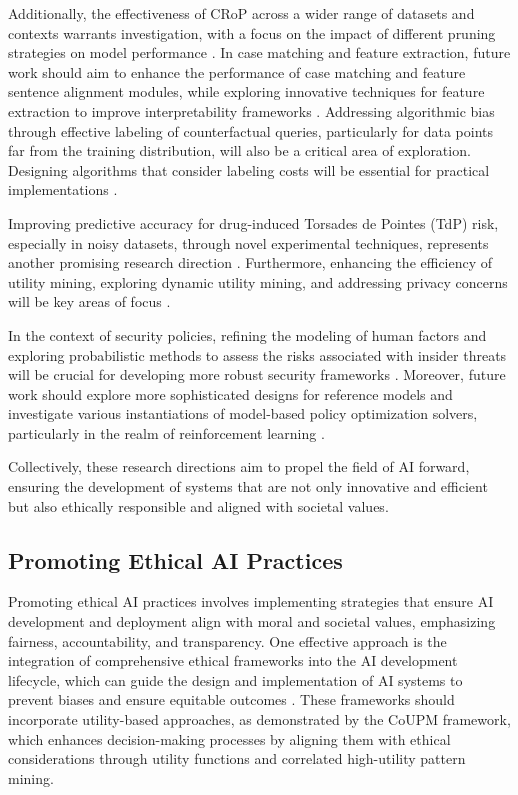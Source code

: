 Additionally, the effectiveness of CRoP across a wider range of datasets and contexts warrants investigation, with a focus on the impact of different pruning strategies on model performance \cite{kaur2024cropcontextwiserobuststatic}. In case matching and feature extraction, future work should aim to enhance the performance of case matching and feature sentence alignment modules, while exploring innovative techniques for feature extraction to improve interpretability frameworks \cite{lin2023interpretabilityframeworksimilarcase}. Addressing algorithmic bias through effective labeling of counterfactual queries, particularly for data points far from the training distribution, will also be a critical area of exploration. Designing algorithms that consider labeling costs will be essential for practical implementations \cite{sen2018supervisingfeatureinfluence}.

Improving predictive accuracy for drug-induced Torsades de Pointes (TdP) risk, especially in noisy datasets, through novel experimental techniques, represents another promising research direction \cite{xi2022statisticallearningpreclinicaldrug}. Furthermore, enhancing the efficiency of utility mining, exploring dynamic utility mining, and addressing privacy concerns will be key areas of focus \cite{gan2019correlatedutilitybasedpatternmining}.

In the context of security policies, refining the modeling of human factors and exploring probabilistic methods to assess the risks associated with insider threats will be crucial for developing more robust security frameworks \cite{kammller2020applyingisabelleinsiderframework}. Moreover, future work should explore more sophisticated designs for reference models and investigate various instantiations of model-based policy optimization solvers, particularly in the realm of reinforcement learning \cite{zhang2022conservativedualpolicyoptimization}.

Collectively, these research directions aim to propel the field of AI forward, ensuring the development of systems that are not only innovative and efficient but also ethically responsible and aligned with societal values.


\subsection{Promoting Ethical AI Practices} \label{subsec:Promoting Ethical AI Practices}

Promoting ethical AI practices involves implementing strategies that ensure AI development and deployment align with moral and societal values, emphasizing fairness, accountability, and transparency. One effective approach is the integration of comprehensive ethical frameworks into the AI development lifecycle, which can guide the design and implementation of AI systems to prevent biases and ensure equitable outcomes \cite{gan2019correlatedutilitybasedpatternmining}. These frameworks should incorporate utility-based approaches, as demonstrated by the CoUPM framework, which enhances decision-making processes by aligning them with ethical considerations through utility functions and correlated high-utility pattern mining.



